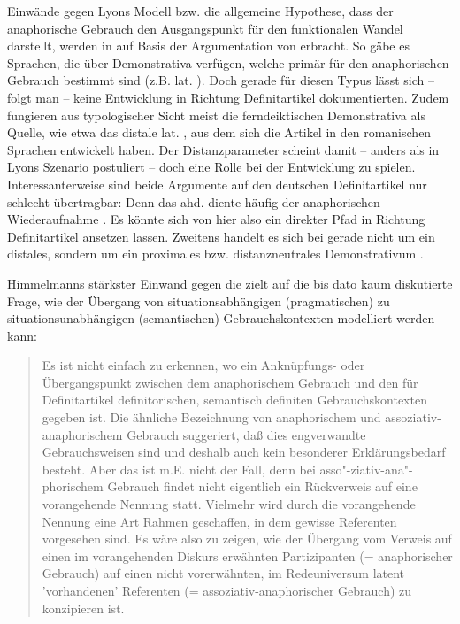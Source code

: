 Einwände gegen Lyons Modell bzw. die allgemeine Hypothese, dass der anaphorische Gebrauch den Ausgangspunkt für den funktionalen Wandel darstellt, werden in 
\textcite[527]{deMulder2011} auf Basis der Argumentation von \textcite[96--98]{Himmelmann1997} erbracht. So gäbe es Sprachen, die über Demonstrativa verfügen, welche primär für den anaphorischen Gebrauch bestimmt sind (z.B. lat. ). Doch gerade für diesen Typus lässt sich -- folgt man \textcite[98]{Himmelmann1997} -- keine Entwicklung in Richtung Definitartikel dokumentierten.  Zudem fungieren aus typologischer Sicht meist die ferndeiktischen Demonstrativa als Quelle, wie etwa das distale lat. , aus dem sich die Artikel in den romanischen Sprachen entwickelt haben. Der Distanzparameter scheint damit -- anders als in Lyons Szenario postuliert -- doch eine Rolle bei der Entwicklung zu spielen. Interessanterweise sind beide Argumente auf den deutschen Definitartikel nur schlecht übertragbar: Denn das ahd.  diente häufig der anaphorischen Wiederaufnahme  \parencite[z.B.][]{Jager1917, Jager1918,Oubouzar1992,Leiss2000}. Es könnte sich von hier also ein direkter Pfad in Richtung Definitartikel ansetzen lassen. Zweitens handelt es sich bei  gerade nicht um ein distales, sondern um ein proximales bzw. distanzneutrales Demonstrativum . 


Himmelmanns stärkster Einwand gegen die  zielt auf die bis dato kaum diskutierte Frage, wie der Übergang von situationsabhängigen (pragmatischen) zu situationsunabhängigen (semantischen) Gebrauchskontexten modelliert werden kann: \blockcquote[94]{Himmelmann1997}{Es ist nicht einfach zu erkennen, wo ein Anknüpfungs- oder Übergangspunkt zwischen dem anaphorischem Gebrauch und den für Definitartikel definitorischen, semantisch definiten Gebrauchskontexten gegeben ist. Die ähnliche Bezeichnung von anaphorischem und assoziativ-anaphorischem Gebrauch suggeriert, daß dies engverwandte Gebrauchsweisen sind und deshalb auch kein besonderer Erklärungsbedarf besteht. Aber das ist m.E. nicht der Fall, denn bei asso"-ziativ-ana"-phorischem Gebrauch findet nicht eigentlich ein Rückverweis auf eine
vorangehende Nennung statt. Vielmehr wird durch die vorangehende Nennung eine Art Rahmen geschaffen, in dem gewisse Referenten vorgesehen sind. 
Es wäre also zu zeigen, wie der Übergang vom Verweis auf einen
im vorangehenden Diskurs erwähnten Partizipanten (= anaphorischer Gebrauch) auf einen
nicht vorerwähnten, im Redeuniversum latent 'vorhandenen' Referenten (= assoziativ-anaphorischer Gebrauch) zu konzipieren ist.}

